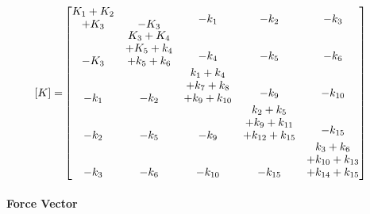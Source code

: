 \documentclass[12pt,a4paper]{article}
\begin{document}
\begin{equation}\label{Eq.stiffness_matrix_dimensional_combined}
\begin{aligned}
[K] =& 
\begin{bmatrix}
\shortstack{$K_1 + K_2$ \\ $+ K_3$} & -K_3 & \shortstack{$-k_1$ \\ \,} & \shortstack{$-k_2$ \\ \,} & \shortstack{$-k_3$ \\ \,} \\
-K_3 & \shortstack{$K_3 + K_4$ \\ $+ K_5 + k_4$ \\ $+ k_5 + k_6$} & \shortstack{$-k_4$ \\ \,} & \shortstack{$-k_5$ \\ \,} & \shortstack{$-k_6$ \\ \,} \\
-k_1 & -k_2 & \shortstack{$k_1 + k_4$ \\ $+ k_7 + k_8$ \\ $+ k_9 + k_{10}$} & \shortstack{$-k_9$ \\ \,} & \shortstack{$-k_{10}$ \\ \,} \\
-k_2 & -k_5 & -k_9 & \shortstack{$k_2 + k_5$ \\ $+ k_9 + k_{11}$ \\ $+ k_{12} + k_{15}$} & \shortstack{$-k_{15}$ \\ \,} \\
-k_3 & -k_{6} & -k_{10} & -k_{15} & \shortstack{$k_3 + k_6$ \\ $+ k_{10} + k_{13}$ \\ $+ k_{14} + k_{15}$}
\end{bmatrix}
\end{aligned}
\end{equation}

\paragraph{Force Vector}
\end{document}
